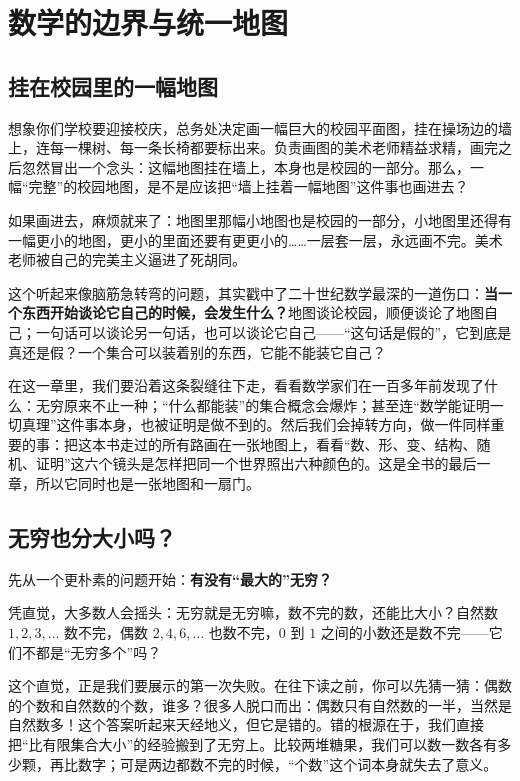 \chapter{数学的边界与统一地图}

\section{挂在校园里的一幅地图}

想象你们学校要迎接校庆，总务处决定画一幅巨大的校园平面图，挂在操场边的墙上，连每一棵树、每一条长椅都要标出来。负责画图的美术老师精益求精，画完之后忽然冒出一个念头：这幅地图挂在墙上，本身也是校园的一部分。那么，一幅“完整”的校园地图，是不是应该把“墙上挂着一幅地图”这件事也画进去？

如果画进去，麻烦就来了：地图里那幅小地图也是校园的一部分，小地图里还得有一幅更小的地图，更小的里面还要有更更小的……一层套一层，永远画不完。美术老师被自己的完美主义逼进了死胡同。

这个听起来像脑筋急转弯的问题，其实戳中了二十世纪数学最深的一道伤口：\textbf{当一个东西开始谈论它自己的时候，会发生什么？}地图谈论校园，顺便谈论了地图自己；一句话可以谈论另一句话，也可以谈论它自己——“这句话是假的”，它到底是真还是假？一个集合可以装着别的东西，它能不能装它自己？

在这一章里，我们要沿着这条裂缝往下走，看看数学家们在一百多年前发现了什么：无穷原来不止一种；“什么都能装”的集合概念会爆炸；甚至连“数学能证明一切真理”这件事本身，也被证明是做不到的。然后我们会掉转方向，做一件同样重要的事：把这本书走过的所有路画在一张地图上，看看“数、形、变、结构、随机、证明”这六个镜头是怎样把同一个世界照出六种颜色的。这是全书的最后一章，所以它同时也是一张地图和一扇门。

\section{无穷也分大小吗？}

先从一个更朴素的问题开始：\textbf{有没有“最大的”无穷？}

凭直觉，大多数人会摇头：无穷就是无穷嘛，数不完的数，还能比大小？自然数 $1, 2, 3, \ldots$ 数不完，偶数 $2, 4, 6, \ldots$ 也数不完，$0$ 到 $1$ 之间的小数还是数不完——它们不都是“无穷多个”吗？

这个直觉，正是我们要展示的第一次失败。在往下读之前，你可以先猜一猜：偶数的个数和自然数的个数，谁多？很多人脱口而出：偶数只有自然数的一半，当然是自然数多！这个答案听起来天经地义，但它是错的。错的根源在于，我们直接把“比有限集合大小”的经验搬到了无穷上。比较两堆糖果，我们可以数一数各有多少颗，再比数字；可是两边都数不完的时候，“个数”这个词本身就失去了意义。

